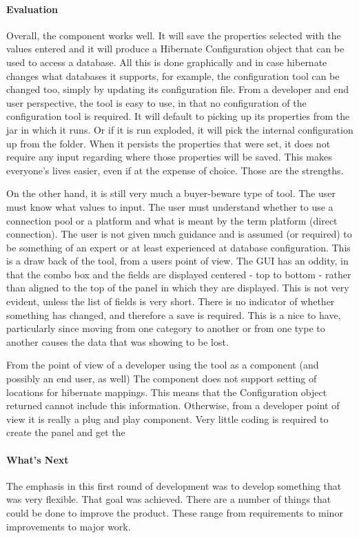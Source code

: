 \paragraph{Evaluation}
Overall, the component works well. It will save the properties selected with the values entered and it will produce a Hibernate Configuration object that can be used to access a database. All this is done graphically and in case hibernate changes what databases it supports, for example, the configuration tool can be changed too, simply by updating its configuration file. From a developer and end user perspective, the tool is easy to use, in that no configuration of the configuration tool is required. It will default to picking up its properties from the jar in which it runs. Or if it is run exploded, it will pick the internal configuration up from the folder. When it persists the properties that were set, it does not require any input regarding where those properties will be saved. This makes everyone's lives easier, even if at the expense of choice. Those are the strengths. 

On the other hand, it is still very much a buyer-beware type of tool. The user must know what values to input. The user must understand whether to use a connection pool or a platform and what is meant by the term platform (direct connection). The user is not given much guidance and is assumed (or required) to be something of an expert or at least experienced at database configuration. This is a draw back of the tool, from a users point of view. The GUI has an oddity, in that the combo box and the fields are displayed centered - top to bottom - rather than aligned to the top of the panel in which they are displayed. This is not very evident, unless the list of fields is very short. There is no indicator of whether something has changed, and therefore a save is required. This is a nice to have, particularly since moving from one category to another or from one type to another causes the data that was showing to be lost.

From the point of view of a developer using the tool as a component (and possibly an end user, as well) The component does not support setting of locations for hibernate mappings. This means that the Configuration object returned cannot include this information. Otherwise, from a developer point of view it is really a plug and play component. Very little coding is required to create the panel and get the 


\paragraph{What's Next}
The emphasis in this first round of development was to develop something that was very flexible. That goal was achieved. There are a number of things that could be done to improve the product. These range from requirements to minor improvements to major work.

